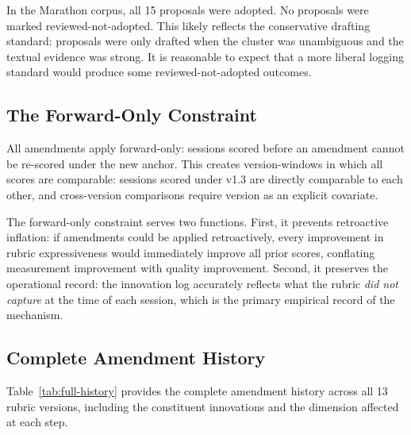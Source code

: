 In the Marathon corpus, all 15 proposals were adopted. No proposals were marked
reviewed-not-adopted. This likely reflects the conservative drafting standard:
proposals were only drafted when the cluster was unambiguous and the textual
evidence was strong. It is reasonable to expect that a more liberal logging
standard would produce some reviewed-not-adopted outcomes.

\subsection{The Forward-Only Constraint}

All amendments apply forward-only: sessions scored before an amendment cannot
be re-scored under the new anchor. This creates version-windows in which all
scores are comparable: sessions scored under v1.3 are directly comparable to
each other, and cross-version comparisons require version as an explicit covariate.

The forward-only constraint serves two functions. First, it prevents retroactive
inflation: if amendments could be applied retroactively, every improvement in
rubric expressiveness would immediately improve all prior scores, conflating
measurement improvement with quality improvement. Second, it preserves the
operational record: the innovation log accurately reflects what the rubric
\textit{did not capture} at the time of each session, which is the primary
empirical record of the mechanism.

\subsection{Complete Amendment History}

Table~\ref{tab:full-history} provides the complete amendment history across all
13 rubric versions, including the constituent innovations and the dimension
affected at each step.

